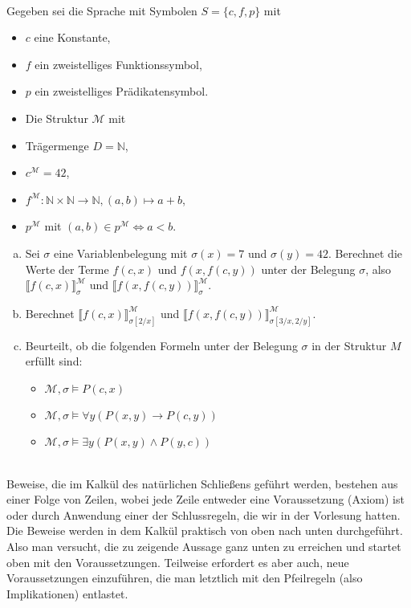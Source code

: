 \\
Gegeben sei die Sprache mit Symbolen $S=\{c,f,p\}$ mit
\begin{itemize}
  \item $c$ eine Konstante,
  \item $f$ ein zweistelliges Funktionssymbol,
  \item $p$ ein zweistelliges Prädikatensymbol.
  \item Die Struktur $\mathcal{M}$ mit
  \item Trägermenge $D=\mathbb{N}$,
  \item $c^\mathcal{M}=42$,
  \item $f^\mathcal{M}:\mathbb{N}\times\mathbb{N}\to\mathbb{N}, (a,b)\mapsto a+b$,
  \item $p^\mathcal{M}$ mit $(a,b)\in p^\mathcal{M} \Leftrightarrow a<b$.
\end{itemize}
\begin{enumerate}[a)]
  \item Sei $\sigma$ eine Variablenbelegung mit $\sigma(x)=7$ und $\sigma(y)=42$. Berechnet die Werte der Terme $f(c,x)$ und $f(x,f(c,y))$ unter der Belegung $\sigma$, also $\llbracket f(c,x) \rrbracket^\mathcal{M}_\sigma$ und $\llbracket f(x,f(c,y)) \rrbracket^\mathcal{M}_\sigma$.
  \item Berechnet $\llbracket f(c,x) \rrbracket^\mathcal{M}_{\sigma[2/x]}$ und $\llbracket f(x,f(c,y)) \rrbracket^\mathcal{M}_{\sigma[3/x,2/y]}$.
  \item Beurteilt, ob die folgenden Formeln unter der Belegung $\sigma$ in der Struktur $M$ erfüllt sind:
  \begin{itemize}
    \item $\mathcal{M},\sigma\models P(c,x)$
    \item $\mathcal{M},\sigma\models\forall y(P(x,y)\to P(c,y))$
    \item $\mathcal{M},\sigma\models\exists y(P(x,y)\wedge P(y,c))$
  \end{itemize}
\end{enumerate} 

\\
Beweise, die im Kalkül des natürlichen Schließens geführt werden, bestehen aus einer Folge von Zeilen, wobei jede Zeile entweder eine Voraussetzung (Axiom) ist oder durch Anwendung einer der Schlussregeln, die wir in der Vorlesung hatten.
Die Beweise werden in dem Kalkül praktisch von oben nach unten durchgeführt. Also man versucht, die zu zeigende Aussage ganz unten zu erreichen und startet oben mit den Voraussetzungen. Teilweise erfordert es aber auch, neue Voraussetzungen einzuführen, die man letztlich mit den Pfeilregeln (also Implikationen) entlastet.


